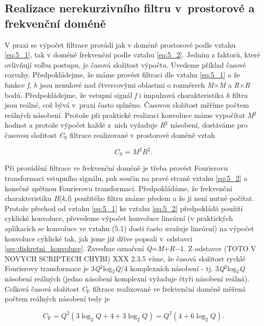 \subsection*{Realizace nerekurzivního filtru v~prostorové a frekvenční doméně}

V praxi se výpočet filtrace provádí jak v doméně prostorové podle vztahu \eqref{eq:5_1}, tak v doméně frekvenční podle vztahu \eqref{eq:5_2}. Jedním z faktorů, které ovlivňují volbu postupu, je časová složitost výpočtu. Uvedeme příklad časové rozvahy. Předpokládejme, že máme provést filtraci dle vztahu \eqref{eq:5_1} a že funkce \textit{f}, \textit{h} jsou nenulové nad čtvercovými oblastmi o rozměrech \textit{M}$\times$\textit{M} a \textit{R}$\times$\textit{R} bodů. Předpokládejme, že vstupní signál \textit{f} i impulzová charakteristika \textit{h} filtru jsou reálné, což bývá v~praxi často splněno. Časovou složitost měříme počtem reálných násobení. Protože při praktické realizaci konvoluce máme vypočítat \textit{M}$^2$ hodnot a protože výpočet každé z~nich vyžaduje \textit{R}$^2$ násobení, dostáváme pro časovou složitost \textit{C}$_\mathrm{S}$ filtrace realizované v prostorové doméně vztah

\begin{equation} \label{eq:5_3}
    C_\mathrm{S} = M^2 R^2.
\end{equation}

Při provádění filtrace ve frekvenční doméně je třeba provést Fourierovu transformaci vstupního signálu, pak součin na pravé straně vztahu \eqref{eq:5_2} a konečně zpětnou Fourierovu transformaci. Předpokládáme, že frekvenční charakteristiku \textit{H}(\textit{k},\textit{l}) použitého filtru známe předem a že ji není nutné počítat. Protože přechod od vztahu \eqref{eq:5_1} ke vztahu \eqref{eq:5_2} předpokládá použití cyklické konvoluce, převedeme výpočet konvoluce lineární (v praktických aplikacích se konvoluce ve vztahu (5.1) dosti často uvažuje lineární) na výpočet konvoluce cyklické tak, jak jsme již dříve popsali v~odstavci \ref{sec:diskretni_konvoluce}. Zaveďme označení \textit{Q}=\textit{M}+\textit{R}$-$1. Z odstavce (TOTO V NOVYCH SCRIPTECH CHYBI) XXX 2.3.5 víme, že časová složitost rychlé Fourierovy transformace je 3\textit{Q}$^2$log$_2$\textit{Q}/4 komplexních násobení - tj. 3\textit{Q}$^2$log$_2$\textit{Q} násobení reálných (jedno násobení komplexní vyžaduje čtyři násobení reálná). Celková časová složitost \textit{C}$_\mathrm{F}$ filtrace realizované ve frekvenční doméně měřená počtem reálných násobení tedy je

\begin{equation} \label{eq:5_4}
    C_\mathrm{F} = Q^2 ( 3 \log_2 Q + 4 + 3 \log_2 Q ) = Q^2 ( 4 + 6 \log_2 Q ).
\end{equation}

